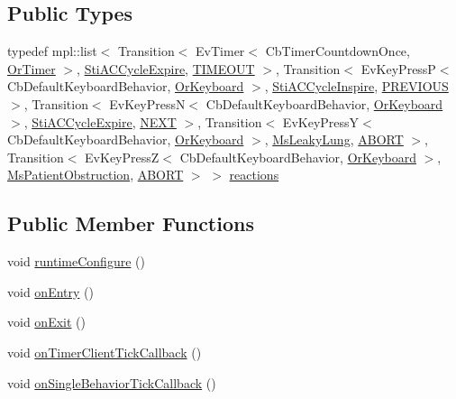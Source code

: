 \subsection*{Public Types}
\begin{DoxyCompactItemize}
\item 
typedef mpl\+::list$<$ Transition$<$ Ev\+Timer$<$ Cb\+Timer\+Countdown\+Once, \hyperlink{classsm__respira__1_1_1OrTimer}{Or\+Timer} $>$, \hyperlink{structsm__respira__1_1_1ac__cycle__inner__states_1_1StiACCycleExpire}{Sti\+A\+C\+Cycle\+Expire}, \hyperlink{structsm__respira__1_1_1ac__cycle__inner__states_1_1StiACCyclePlateau_1_1TIMEOUT}{T\+I\+M\+E\+O\+UT} $>$, Transition$<$ Ev\+Key\+PressP$<$ Cb\+Default\+Keyboard\+Behavior, \hyperlink{classsm__respira__1_1_1OrKeyboard}{Or\+Keyboard} $>$, \hyperlink{structsm__respira__1_1_1ac__cycle__inner__states_1_1StiACCycleInspire}{Sti\+A\+C\+Cycle\+Inspire}, \hyperlink{structsm__respira__1_1_1ac__cycle__inner__states_1_1StiACCyclePlateau_1_1PREVIOUS}{P\+R\+E\+V\+I\+O\+US} $>$, Transition$<$ Ev\+Key\+PressN$<$ Cb\+Default\+Keyboard\+Behavior, \hyperlink{classsm__respira__1_1_1OrKeyboard}{Or\+Keyboard} $>$, \hyperlink{structsm__respira__1_1_1ac__cycle__inner__states_1_1StiACCycleExpire}{Sti\+A\+C\+Cycle\+Expire}, \hyperlink{structsm__respira__1_1_1ac__cycle__inner__states_1_1StiACCyclePlateau_1_1NEXT}{N\+E\+XT} $>$, Transition$<$ Ev\+Key\+PressY$<$ Cb\+Default\+Keyboard\+Behavior, \hyperlink{classsm__respira__1_1_1OrKeyboard}{Or\+Keyboard} $>$, \hyperlink{classsm__respira__1_1_1MsLeakyLung}{Ms\+Leaky\+Lung}, \hyperlink{classABORT}{A\+B\+O\+RT} $>$, Transition$<$ Ev\+Key\+PressZ$<$ Cb\+Default\+Keyboard\+Behavior, \hyperlink{classsm__respira__1_1_1OrKeyboard}{Or\+Keyboard} $>$, \hyperlink{classsm__respira__1_1_1MsPatientObstruction}{Ms\+Patient\+Obstruction}, \hyperlink{classABORT}{A\+B\+O\+RT} $>$ $>$ \hyperlink{structsm__respira__1_1_1ac__cycle__inner__states_1_1StiACCyclePlateau_acd9cc5abce31b5649c617b58ad22a89d}{reactions}
\end{DoxyCompactItemize}
\subsection*{Public Member Functions}
\begin{DoxyCompactItemize}
\item 
void \hyperlink{structsm__respira__1_1_1ac__cycle__inner__states_1_1StiACCyclePlateau_a229672a01707f33d91148d559b831a05}{runtime\+Configure} ()
\item 
void \hyperlink{structsm__respira__1_1_1ac__cycle__inner__states_1_1StiACCyclePlateau_a2ea78ab44fbe8c8a8bac8f021287cd9f}{on\+Entry} ()
\item 
void \hyperlink{structsm__respira__1_1_1ac__cycle__inner__states_1_1StiACCyclePlateau_a4e804c781c76b77ac071d6ecc8cb05c5}{on\+Exit} ()
\item 
void \hyperlink{structsm__respira__1_1_1ac__cycle__inner__states_1_1StiACCyclePlateau_acfda325853e6a5aaba8e6a5383f8c1ce}{on\+Timer\+Client\+Tick\+Callback} ()
\item 
void \hyperlink{structsm__respira__1_1_1ac__cycle__inner__states_1_1StiACCyclePlateau_a5d6305fc319e092313e74fcc266095e4}{on\+Single\+Behavior\+Tick\+Callback} ()
\end{DoxyCompactItemize}
